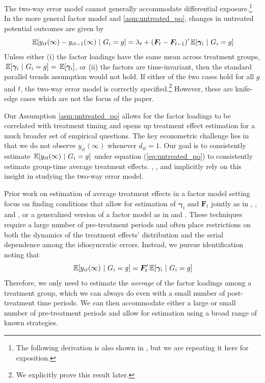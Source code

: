 \documentclass[12pt]{article}
\begin{document}
The two-way error model cannot generally accommodate differential exposure.\footnote{The following derivation is also shown in \citet{Callaway_Karami_2020}, but we are repeating it here for exposition.} In the more general factor model and \autoref{asm:untreated_po}, changes in untreated potential outcomes are given by
\begin{equation*}
  \expec{y_{it}(\infty) - y_{it-1}(\infty)}{G_i = g} = \lambda_t + (\bm{F}_t - \bm{F}_{t-1})' \expec{\bm \gamma_i}{G_i = g}
\end{equation*}
Unless either (i) the factor loadings have the same mean across treatment groups, $\expec{\bm \gamma_i}{G_i = g} = \expec{\bm \gamma_i}$, or (ii) the factors are time-invariant, then the standard parallel trends assumption would not hold. If either of the two cases hold for all $g$ and $t$, the two-way error model is correctly specified.\footnote{We explicitly prove this result later.} However, these are knife-edge cases which are not the focus of the paper. 

Our Assumption \ref{asm:untreated_po} allows for the factor loadings to be correlated with treatment timing and opens up treatment effect estimation for a much broader set of empirical questions. The key econometric challenge lies in that we do not observe $y_{it}(\infty)$ whenever $d_{it} = 1$. Our goal is to consistently estimate $\expec{y_{it}(\infty)}{G_i = g}$ under equation (\ref{eq:untreated_po}) to consistently estimate group-time average treatment effects. \citet{Gardner_2021}, \citet{Wooldridge_2021}, and \citet{Borusyak_Jaravel_Spiess_2021} implicitly rely on this insight in studying the two-way error model. 

Prior work on estimation of average treatment effects in a factor model setting focus on finding conditions that allow for estimation of $\bm \gamma_i$ and $\bm{F}_t$ jointly as in \citet{Gobillon_Magnac_2016}, \citet{xu2017generalized}, and \citet{Bai_Ng_2021}, or a generalized version of a factor model as in \citet{Feng_2020} and \citet{arkhangelsky2021synthetic}. These techniques require a large number of pre-treatment periods and often place restrictions on both the dynamics of the treatment effects' distribution and the serial dependence among the idiosyncratic errors. Instead, we pursue identification noting that 
\begin{equation}\label{eq:untreated_cond_expectation}
\expec{y_{it}(\infty)}{G_i = g} = \bm{F}_t' \expec{\bm \gamma_i}{G_i = g}
\end{equation}
Therefore, we only need to estimate the \emph{average} of the factor loadings among a treatment group, which we can always do even with a small number of post-treatment time periods. We can then accommodate either a large or small number of pre-treatment periods and allow for estimation using a broad range of known strategies.
\end{document}
